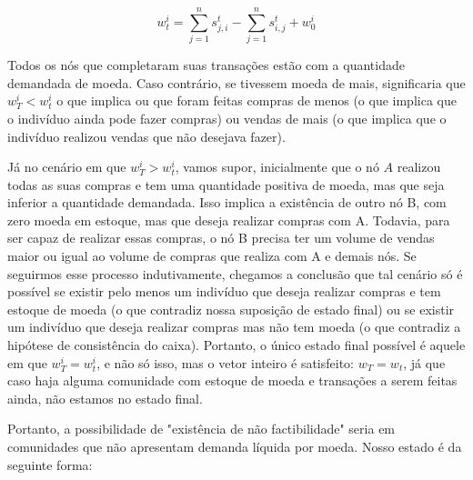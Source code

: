 \documentclass{article}
\begin{document}
$$w^i_t = \sum^n_{j=1} {s^t_{j,i}}-\sum^n_{j=1} {s^t_{i,j}} + w^i_{0}$$
\par Todos os nós que completaram suas transações estão com a quantidade demandada de moeda. Caso contrário, se tivessem moeda de mais, significaria que $w^i_T < w^i_t$ o que implica ou que foram feitas compras de menos (o que implica que o indivíduo ainda pode fazer compras) ou vendas de mais (o que implica que o indivíduo realizou vendas que não desejava fazer). 
\par Já no cenário em que $w^i_T > w^i_t$, vamos supor, inicialmente que o nó $A$ realizou todas as suas compras e tem uma quantidade positiva de moeda, mas que seja inferior a quantidade demandada. Isso implica a existência de outro nó B, com zero moeda em estoque, mas que deseja realizar compras com A. Todavia, para ser capaz de realizar essas compras, o nó B precisa ter um volume de vendas maior ou igual ao volume de compras que realiza com A e demais nós. Se seguirmos esse processo indutivamente, chegamos a conclusão que tal cenário só é possível se existir pelo menos um indivíduo que deseja realizar compras e tem estoque de moeda (o que contradiz nossa suposição de estado final) ou se existir um indivíduo que deseja realizar compras mas não tem moeda (o que contradiz a hipótese de consistência do caixa). Portanto, o único estado final possível é aquele em que $w^i_T = w^i_t$, e não só isso, mas o vetor inteiro é satisfeito: $w_T = w_t$, já que caso haja alguma comunidade com estoque de moeda e transações a serem feitas ainda, não estamos no estado final.
\par Portanto, a possibilidade de "existência de não factibilidade" seria em comunidades que não apresentam demanda líquida por moeda. Nosso estado é da seguinte forma:
\par {}
\end{document}
